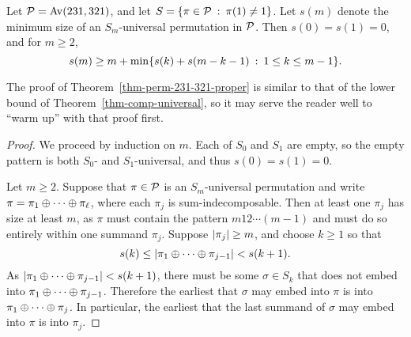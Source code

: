 \begin{theorem}
\label{thm-perm-231-321-proper}
	Let $\P = \Av(231, 321)$, and let $S = \{\pi \in \P \st \pi(1) \neq 1\}$. Let $s(m)$ denote the minimum size of an $S_m$-universal permutation in $\P$. Then $s(0) = s(1) = 0$, and for $m \ge 2$,
	\[
		s(m)
		\ge
		m + \min\{s(k) + s(m-k-1) \st 1 \le k \le m-1\}.
	\]
\end{theorem}
The proof of Theorem~\ref{thm-perm-231-321-proper} is similar to that of the lower bound of Theorem~\ref{thm-comp-universal}, so it may serve the reader well to ``warm up'' with that proof first.
\begin{proof}
	We proceed by induction on $m$. Each of $S_0$ and $S_1$ are empty, so the empty pattern is both $S_0$- and $S_1$-universal, and thus $s(0) = s(1) = 0$. 

	Let $m \ge 2$. Suppose that $\pi \in \P$ is an $S_m$-universal permutation and write $\pi = \pi_{1} \directsum \cdots \directsum \pi_\ell$, where each $\pi_j$ is sum-indecomposable. Then at least one $\pi_j$ has size at least $m$, as $\pi$ must contain the pattern $m 1 2 \cdots (m-1)$ and must do so entirely within one summand $\pi_j$. Suppose $\size{\pi_j} \ge m$, and choose $k \ge 1$ so that
	\[
		s(k)
		\le
		\size{\pi_{1} \directsum \cdots \directsum \pi_{j-1}}
		<
		s(k+1).
	\]
	As $\size{\pi_{1} \directsum \cdots \directsum \pi_{j-1}} < s(k+1)$, there must be some $\sigma \in S_k$ that does not embed into $\pi_{1} \directsum \cdots \directsum \pi_{j-1}$. Therefore the earliest that $\sigma$ may embed into $\pi$ is into $\pi_{1} \directsum \cdots \directsum \pi_{j}$. In particular, the earliest that the last summand of $\sigma$ may embed into $\pi$ is into $\pi_{j}$. 
	

\end{proof}
